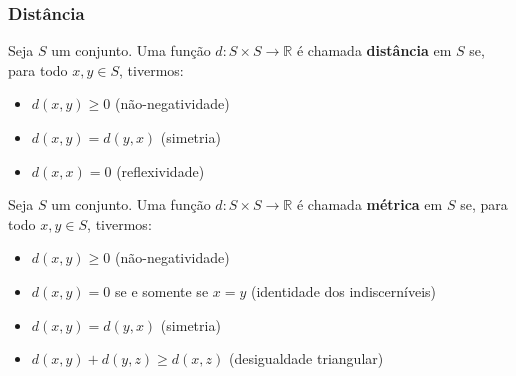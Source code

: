 \begin{frame}[allowframebreaks]
  \frametitle{Distância}
  \begin{definition}[distância]
  Seja $S$ um conjunto. Uma função $d: S \times S \rightarrow \mathbb{R}$ é chamada \textbf{distância} em $S$
  se, para todo $x,y \in S$, tivermos:
  \begin{itemize}
  \item $d(x,y) \geq 0$ (não-negatividade)
  \item $d(x,y) = d(y,x)$ (simetria)
  \item $d(x,x) = 0$ (reflexividade)
  \end{itemize}
  \end{definition}

  \framebreak
  \begin{definition}[métrica]
  Seja $S$ um conjunto. Uma função $d: S \times S \rightarrow \mathbb{R}$ é chamada \textbf{métrica} em $S$
  se, para todo $x,y \in S$, tivermos:
  \begin{itemize}
  \item $d(x,y) \geq 0$ (não-negatividade)
  \item $d(x,y) = 0$ se e somente se $x=y$ (identidade dos indiscerníveis)
  \item $d(x,y) = d(y,x)$ (simetria)
  \item $d(x,y) + d(y,z) \geq d(x,z)$ (desigualdade triangular)
  \end{itemize}
  \end{definition}
\end{frame}

